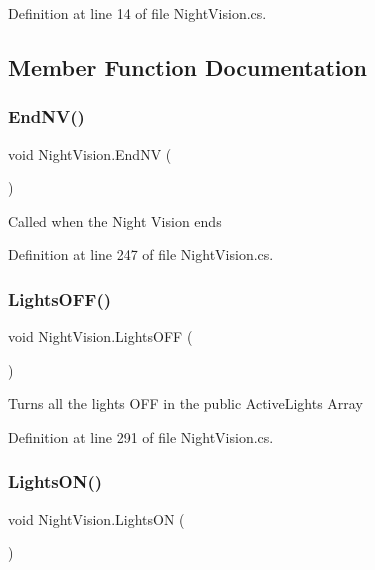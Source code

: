 Definition at line 14 of file Night\+Vision.\+cs.



\subsection{Member Function Documentation}
\mbox{\label{class_night_vision_adbc1111e211f1759bb67b6118ee3118c}} 
\subsubsection{\texorpdfstring{End\+N\+V()}{EndNV()}}
{\footnotesize\ttfamily void Night\+Vision.\+End\+NV (\begin{DoxyParamCaption}{ }\end{DoxyParamCaption})}



Called when the Night Vision ends 



Definition at line 247 of file Night\+Vision.\+cs.

\mbox{\label{class_night_vision_a5d61b9beaa4d3cb9b1d42677e6e77124}} 
\subsubsection{\texorpdfstring{Lights\+O\+F\+F()}{LightsOFF()}}
{\footnotesize\ttfamily void Night\+Vision.\+Lights\+O\+FF (\begin{DoxyParamCaption}{ }\end{DoxyParamCaption})}



Turns all the lights O\+FF in the public Active\+Lights Array 



Definition at line 291 of file Night\+Vision.\+cs.

\mbox{\label{class_night_vision_ae34023a85285e821c06db76a48af5d18}} 
\subsubsection{\texorpdfstring{Lights\+O\+N()}{LightsON()}}
{\footnotesize\ttfamily void Night\+Vision.\+Lights\+ON (\begin{DoxyParamCaption}{ }\end{DoxyParamCaption})}



